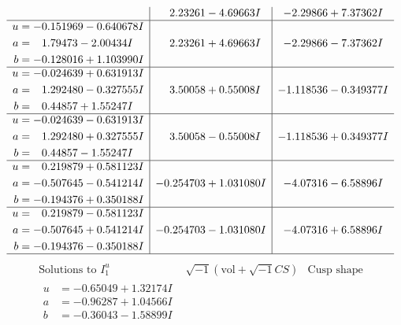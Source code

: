 \documentclass[1p]{elsarticle_modified}
\theoremstyle{definition}
\newcommand{\I}{\sqrt{-1}}
\begin{document}
$$\begin{array}{c|c|c}
 & \phantom{-}2.23261 - 4.69663 I & -2.29866 + 7.37362 I \\ \hline\begin{aligned}
u &= -0.151969 - 0.640678 I \\
a &= \phantom{-}1.79473 - 2.00434 I \\
b &= -0.128016 + 1.103990 I\end{aligned}
 & \phantom{-}2.23261 + 4.69663 I & -2.29866 - 7.37362 I \\ \hline\begin{aligned}
u &= -0.024639 + 0.631913 I \\
a &= \phantom{-}1.292480 - 0.327555 I \\
b &= \phantom{-}0.44857 + 1.55247 I\end{aligned}
 & \phantom{-}3.50058 + 0.55008 I & -1.118536 - 0.349377 I \\ \hline\begin{aligned}
u &= -0.024639 - 0.631913 I \\
a &= \phantom{-}1.292480 + 0.327555 I \\
b &= \phantom{-}0.44857 - 1.55247 I\end{aligned}
 & \phantom{-}3.50058 - 0.55008 I & -1.118536 + 0.349377 I \\ \hline\begin{aligned}
u &= \phantom{-}0.219879 + 0.581123 I \\
a &= -0.507645 - 0.541214 I \\
b &= -0.194376 + 0.350188 I\end{aligned}
 & -0.254703 + 1.031080 I & -4.07316 - 6.58896 I \\ \hline\begin{aligned}
u &= \phantom{-}0.219879 - 0.581123 I \\
a &= -0.507645 + 0.541214 I \\
b &= -0.194376 - 0.350188 I\end{aligned}
 & -0.254703 - 1.031080 I & -4.07316 + 6.58896 I\\
 \hline 
 \end{array}$$\newpage$$\begin{array}{c|c|c}  
\text{Solutions to }I^u_{1}& \I (\text{vol} + \sqrt{-1}CS) & \text{Cusp shape}\\
 \hline 
\begin{aligned}
u &= -0.65049 + 1.32174 I \\
a &= -0.96287 + 1.04566 I \\
b &= -0.36043 - 1.58899 I\end{aligned}

\end{array}$$
\end{document}
